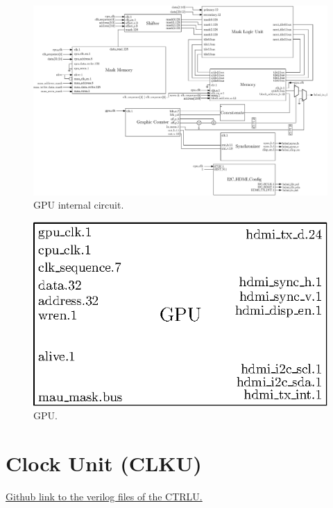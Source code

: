 \begin{figure}[H]
    \centering
    \includegraphics[width=\linewidth]{Chapter4-GPU_CLKU/res/gpu_in}
    \caption{GPU internal circuit.}
    \label{fig:gpu/gpu_in}
\end{figure}

\begin{figure}[H]
    \centering
    \includegraphics[scale=1.0]{Chapter4-GPU_CLKU/res/gpu}
    \caption{GPU.}
    \label{fig:gpu/gpu}
\end{figure}

\section{Clock Unit (CLKU)}

\href{https://github.com/AnotherGitAccount/TFE/tree/master/hardware/rtl/clku}{Github link to the verilog files of the CTRLU.}

